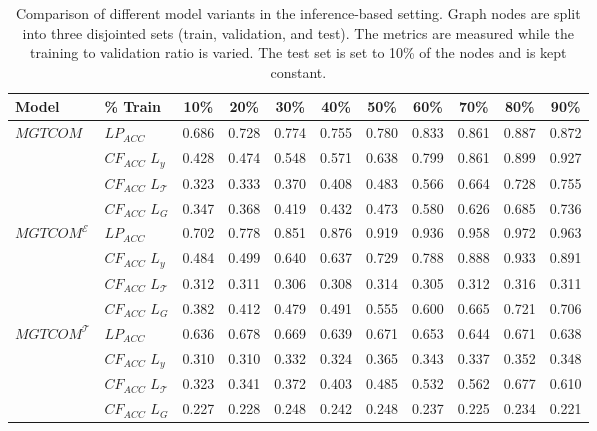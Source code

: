 \begin{table*}[t!]
\centering
\caption{
    Comparison of different model variants in the inference-based setting. 
    Graph nodes are split into three disjointed sets (train, validation, and test).
    The metrics are measured while the training to validation ratio is varied. 
    The test set is set to 10\% of the nodes and is kept constant.
}
\label{tab:results_inference}
    \begin{tabular}{ll|ccccccccc}
    \toprule
     \textbf{Model}                      & \textbf{\% Train} &            10\% &            20\% &            30\% &            40\% &            50\% &            60\% &            70\% &            80\% &            90\% \\ 
    \midrule
$MGTCOM$ 
                       & $LP_{ACC}$ &  0.686 &  0.728 &  0.774 &  0.755 &  0.780 &  0.833 &  0.861 &  0.887 &  0.872 \\
                       & $CF_{ACC}$ $L_y$ &  0.428 &  0.474 &  0.548 &  0.571 &  0.638 &  0.799 &  0.861 &  0.899 &  0.927 \\
                       & $CF_{ACC}$ $L_\mathcal{T}$ &  0.323 &  0.333 &  0.370 &  0.408 &  0.483 &  0.566 &  0.664 &  0.728 &  0.755 \\
                       & $CF_{ACC}$ $L_G$ &  0.347 &  0.368 &  0.419 &  0.432 &  0.473 &  0.580 &  0.626 &  0.685 &  0.736 \\ \midrule
$MGTCOM^{\mathcal{E}}$ 
                       & $LP_{ACC}$ &  0.702 &  0.778 &  0.851 &  0.876 &  0.919 &  0.936 &  0.958 &  0.972 &  0.963 \\
                       & $CF_{ACC}$ $L_y$ &  0.484 &  0.499 &  0.640 &  0.637 &  0.729 &  0.788 &  0.888 &  0.933 &  0.891 \\
                       & $CF_{ACC}$ $L_\mathcal{T}$ &  0.312 &  0.311 &  0.306 &  0.308 &  0.314 &  0.305 &  0.312 &  0.316 &  0.311 \\
                       & $CF_{ACC}$ $L_G$ &  0.382 &  0.412 &  0.479 &  0.491 &  0.555 &  0.600 &  0.665 &  0.721 &  0.706 \\ \midrule
$MGTCOM^{\mathcal{T}}$ 
                       & $LP_{ACC}$ &  0.636 &  0.678 &  0.669 &  0.639 &  0.671 &  0.653 &  0.644 &  0.671 &  0.638 \\
                       & $CF_{ACC}$ $L_y$ &  0.310 &  0.310 &  0.332 &  0.324 &  0.365 &  0.343 &  0.337 &  0.352 &  0.348 \\
                       & $CF_{ACC}$ $L_\mathcal{T}$ &  0.323 &  0.341 &  0.372 &  0.403 &  0.485 &  0.532 &  0.562 &  0.677 &  0.610 \\
                       & $CF_{ACC}$ $L_G$ &  0.227 &  0.228 &  0.248 &  0.242 &  0.248 &  0.237 &  0.225 &  0.234 &  0.221 \\
    \bottomrule
    \end{tabular}

\end{table*}